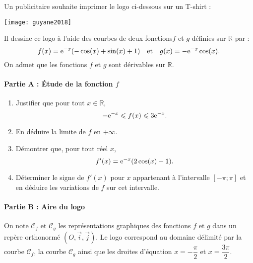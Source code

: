 \documentclass[11pt,fleqn, openany]{book} %
\begin{document}
\begin{exercise}[subtitle={(Guyane 2018)}]Un publicitaire souhaite imprimer le logo ci-dessous sur un T-shirt : 

\begin{center}
\texttt{[image: guyane2018]}
\end{center}

Il dessine ce logo à l'aide des courbes de deux fonctions$f$ et $g$ définies sur $\mathbb{R}$ par :
\[f(x)=\mathrm{e}^{-x}(-\cos(x)+\sin(x)+1)\quad\text{et}\quad g(x)=-\mathrm{e}^{-x}\cos(x).\]
On admet que les fonctions $f$ et $g$ sont dérivables sur $\mathbb{R}$.

\paragraph{Partie A : Étude de la fonction $f$}

\begin{enumerate}
\item Justifier que pour tout $x\in\mathbb{R}$,
\[-\mathrm{e}^{-x} \leqslant f(x) \leqslant 3\mathrm{e}^{-x}.\]
\item En déduire la limite de $f$ en $+\infty$.
\item Démontrer que, pour tout réel $x$,
\[f'(x)=\mathrm{e}^{-x}(2\cos(x)-1).\]
\item Déterminer le signe de $f'(x)$ pour $x$ appartenant à l'intervalle $[-\pi ; \pi]$ et en déduire les variations de $f$ sur cet intervalle.
\end{enumerate}

\paragraph{Partie B : Aire du logo}

On note $\mathcal{C}_f$ et $\mathcal{C}_g$ les représentations graphiques des fonctions $f$ et $g$ dans un repère orthonormé $(O, \vec i, \vec j)$. Le logo correspond au domaine délimité par la courbe $\mathcal{C}_f$, la courbe $\mathcal{C}_g$ ainsi que les droites d'équation $x=-\dfrac{\pi}{2}$ et $x=\dfrac{3\pi}{2}$.

\begin{center}
\end{center}
\end{exercise}
\end{document}
